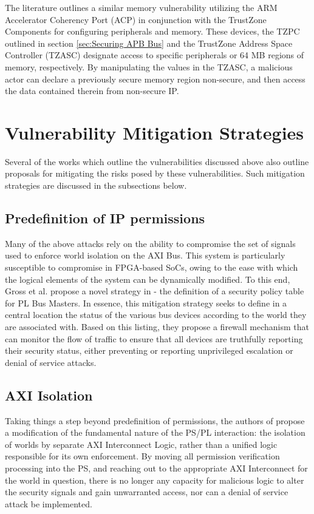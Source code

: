 \documentclass[journal]{IEEEtran}
\begin{document}
The literature \cite{benhani_security_2019} outlines a similar memory vulnerability
utilizing the ARM Accelerator Coherency Port (ACP) in conjunction with the TrustZone
Components for configuring peripherals and memory. These devices, the TZPC outlined in 
section \ref{sec:Securing APB Bus} and the TrustZone Address Space Controller (TZASC) 
designate access to specific peripherals or 64 MB regions of memory, respectively. By 
manipulating the values in the TZASC, a malicious actor can declare a previously secure
memory region non-secure, and then access the data contained therein from non-secure IP.

\section{Vulnerability Mitigation Strategies} \label{sec:Mitigation}
Several of the works which outline the vulnerabilities discussed above also outline
proposals for mitigating the risks posed by these vulnerabilities. Such mitigation
strategies are discussed in the subsections below.
\subsection{Predefinition of IP permissions} \label{sec:IP Predefinition}
Many of the above attacks rely on the ability to compromise the set of signals used to
enforce world isolation on the AXI Bus. This system is particularly susceptible to
compromise in FPGA-based SoCs, owing to the ease with which the logical elements of the
system can be dynamically modified. To this end, Gross et al. propose a novel strategy in
\cite{gross_breaking_2019} - the definition of a security policy table for PL Bus Masters.
In essence, this mitigation strategy seeks to define in a central location the status of
the various bus devices according to the world they are associated with. Based on this
listing, they propose a firewall mechanism that can monitor the flow of traffic to ensure
that all devices are truthfully reporting their security status, either preventing or 
reporting unprivileged escalation or denial of service attacks.

\subsection{AXI Isolation} \label{sec:AXI Isolation}
Taking things a step beyond predefinition of permissions, the authors of 
\cite{benhani_security_2017} propose a modification of the fundamental nature of the PS/PL
interaction: the isolation of worlds by separate AXI Interconnect Logic, rather than a 
unified logic responsible for its own enforcement. By moving all permission verification
processing into the PS, and reaching out to the appropriate AXI Interconnect for the world
in question, there is no longer any capacity for malicious logic to alter the security
signals and gain unwarranted access, nor can a denial of service attack be implemented.
\end{document}
